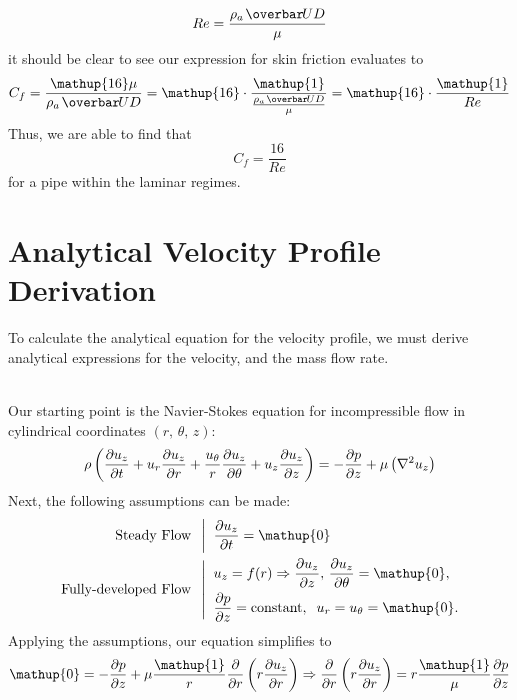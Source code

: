 \begin{equation}
    Re = \frac{\rho_a \avg{U} D}{\mu}
\end{equation}
it should be clear to see our expression for skin friction evaluates to
\begin{equation}
    C_f = \frac{\mathup{16}\mu}{\rho_a \avg{U} D} = \mathup{16}\cdot\frac{\mathup{1}}{\frac{\rho_a \avg{U}D}{\mu}} = \mathup{16} \cdot \frac{\mathup{1}}{Re}
\end{equation}
Thus, we are able to find that
\begin{equation}
    C_f = \frac{\mathup{16}}{Re}
\end{equation}
for a pipe within the laminar regimes.
\newpage

\section{Analytical Velocity Profile Derivation}
\label{appendix:c}
To calculate the analytical equation for the velocity profile, we must derive analytical expressions for the velocity, and the mass flow rate. \par
\zerodel\\ Our starting point is the Navier-Stokes equation for incompressible flow in cylindrical coordinates \(\left(r,\, \theta,\, z\right)\):
\begin{equation}
\label{equations:navier_stokes_equation}
    \rho\left(\frac{\partial u_z}{\partial t}+u_r\frac{\partial u_z}{\partial r} + \frac{u_\theta}{r}\frac{\partial u_z}{\partial \theta}+u_z\frac{\partial u_z}{\partial z}\right) = -\frac{\partial p}{\partial z} + \mu\left(\nabla^2u_z\right)
\end{equation}
Next, the following assumptions can be made:
\begin{align*}
    \text{Steady Flow} \;\; & \left| \;\; \pdv{u_z}{t} = \mathup{0} \right. \\
    \text{Fully-developed Flow} \;\; &
    \left| \;\;
    \begin{aligned}
        & u_z = f(r) \Rightarrow \pdv{u_z}{z}, \,\pdv{u_z}{\theta} = \mathup{0}, \\
        & \pdv{p}{z} = \text{constant}, \;\; u_r = u_\theta = \mathup{0}.
    \end{aligned}
    \right\zerodel
\end{align*}
Applying the assumptions, our equation simplifies to
\begin{equation}
    \mathup{0} = -\pdv{p}{z} + \mu\frac{\mathup{1}}{r}\frac{\partial}{\partial r}\left(r\pdv{u_z}{r}\right) \Rightarrow \frac{\partial}{\partial r}\left(r\pdv{u_z}{r}\right) = r \frac{\mathup{1}}{\mu}\pdv{p}{z}
\end{equation}
